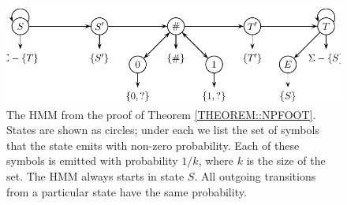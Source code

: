 \begin{figure}[t]
\centerline{\includegraphics[scale=0.68]{../figures/jcss/cliquehmm.pdf}}
\caption{\label{fig:footprint_hmm} The HMM from the proof of Theorem
  \ref{THEOREM::NPFOOT}. States are shown as circles; under each we
  list the set of symbols that the state emits with non-zero
  probability. Each of these symbols is emitted with probability
  $1/k$, where $k$ is the size of the set. The HMM always starts in
  state $S$. All outgoing transitions from a particular state have
  the same probability.}
\end{figure}
